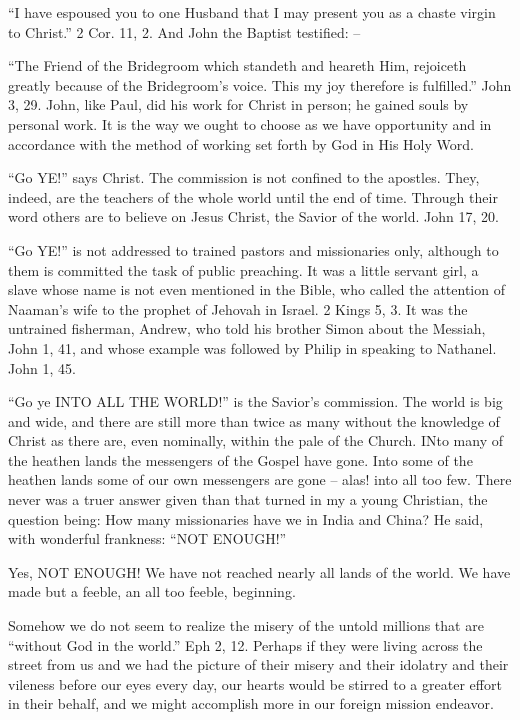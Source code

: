 \documentclass[
]{book}
\begin{document}
``I have espoused you to one Husband that I may present you as a chaste virgin to Christ.'' 2 Cor. 11, 2. And John the Baptist testified: --

``The Friend of the Bridegroom which standeth and heareth Him, rejoiceth greatly because of the Bridegroom's voice. This my joy therefore is fulfilled.'' John 3, 29. John, like Paul, did his work for Christ in person; he gained souls by personal work. It is the way we ought to choose as we have opportunity and in accordance with the method of working set forth by God in His Holy Word.

``Go YE!'' says Christ. The commission is not confined to the apostles. They, indeed, are the teachers of the whole world until the end of time. Through their word others are to believe on Jesus Christ, the Savior of the world. John 17, 20.

``Go YE!'' is not addressed to trained pastors and missionaries only, although to them is committed the task of public preaching. It was a little servant girl, a slave whose name is not even mentioned in the Bible, who called the attention of Naaman's wife to the prophet of Jehovah in Israel. 2 Kings 5, 3. It was the untrained fisherman, Andrew, who told his brother Simon about the Messiah, John 1, 41, and whose example was followed by Philip in speaking to Nathanel. John 1, 45.

``Go ye INTO ALL THE WORLD!'' is the Savior's commission. The world is big and wide, and there are still more than twice as many without the knowledge of Christ as there are, even nominally, within the pale of the Church. INto many of the heathen lands the messengers of the Gospel have gone. Into some of the heathen lands some of our own messengers are gone -- alas! into all too few. There never was a truer answer given than that turned in my a young Christian, the question being: How many missionaries have we in India and China? He said, with wonderful frankness: ``NOT ENOUGH!''

Yes, NOT ENOUGH! We have not reached nearly all lands of the world. We have made but a feeble, an all too feeble, beginning.

Somehow we do not seem to realize the misery of the untold millions that are ``without God in the world.'' Eph 2, 12. Perhaps if they were living across the street from us and we had the picture of their misery and their idolatry and their vileness before our eyes every day, our hearts would be stirred to a greater effort in their behalf, and we might accomplish more in our foreign mission endeavor.
\end{document}
